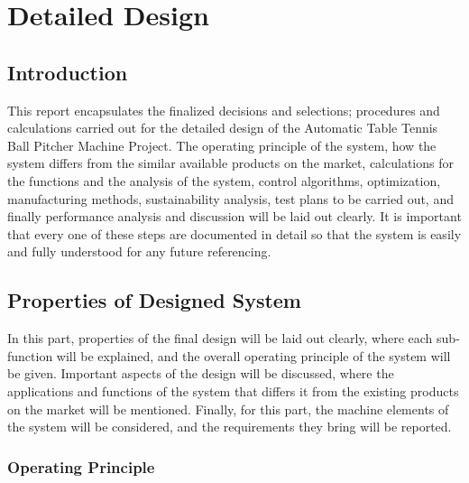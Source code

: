 \documentclass[12pt]{report}
\begin{document}
\chapter{Detailed Design}

\section{Introduction}

This report encapsulates the finalized decisions and selections; procedures and calculations carried out for the detailed design of the Automatic Table Tennis Ball Pitcher Machine Project. The operating principle of the system, how the system differs from the similar available products on the market, calculations for the functions and the analysis of the system, control algorithms, optimization, manufacturing methods, sustainability analysis, test plans to be carried out, and finally performance analysis and discussion will be laid out clearly. It is important that every one of these steps are documented in detail so that the system is easily and fully understood for any future referencing.

\section{Properties of Designed System}

In this part, properties of the final design will be laid out clearly, where each sub-function will be explained, and the overall operating principle of the system will be given. Important aspects of the design will be discussed, where the applications and functions of the system that differs it from the existing products on the market will be mentioned. Finally, for this part, the machine elements of the system will be considered, and the requirements they bring will be reported.

\subsection{Operating Principle}
\end{document}
